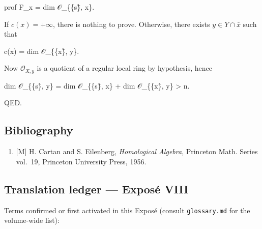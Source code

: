\documentclass[
]{article}
\newenvironment{Shaded}{}{}
\newcommand{\NormalTok}[1]{#1}
\providecommand{\tightlist}{%
  \setlength{\itemsep}{0pt}\setlength{\parskip}{0pt}}
\begin{document}
\begin{Shaded}
\begin{Highlighting}[]
\NormalTok{prof F\_x = dim 𝒪\_\{\{s\}̄, x\}.}
\end{Highlighting}
\end{Shaded}

If \(c(x) = +\infty\), there is nothing to prove. Otherwise, there
exists \(y \in Y \cap \bar{x}\) such that

\begin{Shaded}
\begin{Highlighting}[]
\NormalTok{c(x) = dim 𝒪\_\{\{x\}̄, y\}.}
\end{Highlighting}
\end{Shaded}

Now \(\mathcal{O}_{X, y}\) is a quotient of a regular local ring by
hypothesis, hence

\begin{Shaded}
\begin{Highlighting}[]
\NormalTok{dim 𝒪\_\{\{s\}̄, y\} = dim 𝒪\_\{\{s\}̄, x\} + dim 𝒪\_\{\{x\}̄, y\} \textgreater{} n.}
\end{Highlighting}
\end{Shaded}

QED.

\subsection{Bibliography}\label{bibliography-2}

\begin{enumerate}
\def\labelenumi{\arabic{enumi}.}
\tightlist
\item
  {[}M{]} H. Cartan and S. Eilenberg, \emph{Homological Algebra},
  Princeton Math. Series vol.~19, Princeton University Press, 1956.
\end{enumerate}

\subsection{Translation ledger --- Exposé
VIII}\label{translation-ledger-exposuxe9-viii}

Terms confirmed or first activated in this Exposé (consult
\texttt{glossary.md} for the volume-wide list):
\end{document}
